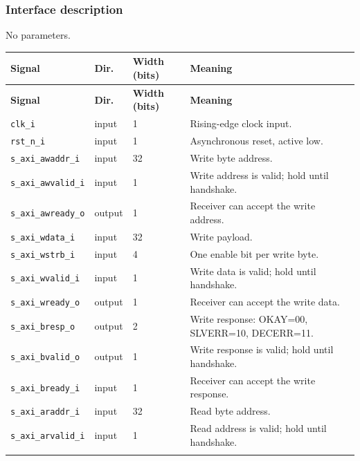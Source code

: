 \documentclass[11pt]{article}
\begin{document}
\subsubsection{Interface description}
\noindent No parameters.\par\medskip
{\small
\begin{longtable}{@{}L{0.3400\dimexpr\linewidth-36pt\relax}L{0.1000\dimexpr\linewidth-36pt\relax}L{0.1000\dimexpr\linewidth-36pt\relax}L{0.4600\dimexpr\linewidth-36pt\relax}@{}}
\toprule
\textbf{Signal} & \textbf{Dir.} & \textbf{Width (bits)} & \textbf{Meaning} \\ \midrule
\endfirsthead
\toprule
\textbf{Signal} & \textbf{Dir.} & \textbf{Width (bits)} & \textbf{Meaning} \\ \midrule
\endhead
\texttt{clk\_i} & input & 1 & Rising-edge clock input. \\ \addlinespace[3pt]
\texttt{rst\_n\_i} & input & 1 & Asynchronous reset, active low. \\ \addlinespace[3pt]
\texttt{s\_axi\_awaddr\_i} & input & 32 & Write byte address. \\ \addlinespace[3pt]
\texttt{s\_axi\_awvalid\_i} & input & 1 & Write address is valid; hold until handshake. \\ \addlinespace[3pt]
\texttt{s\_axi\_awready\_o} & output & 1 & Receiver can accept the write address. \\ \addlinespace[3pt]
\texttt{s\_axi\_wdata\_i} & input & 32 & Write payload. \\ \addlinespace[3pt]
\texttt{s\_axi\_wstrb\_i} & input & 4 & One enable bit per write byte. \\ \addlinespace[3pt]
\texttt{s\_axi\_wvalid\_i} & input & 1 & Write data is valid; hold until handshake. \\ \addlinespace[3pt]
\texttt{s\_axi\_wready\_o} & output & 1 & Receiver can accept the write data. \\ \addlinespace[3pt]
\texttt{s\_axi\_bresp\_o} & output & 2 & Write response: OKAY=00, SLVERR=10, DECERR=11. \\ \addlinespace[3pt]
\texttt{s\_axi\_bvalid\_o} & output & 1 & Write response is valid; hold until handshake. \\ \addlinespace[3pt]
\texttt{s\_axi\_bready\_i} & input & 1 & Receiver can accept the write response. \\ \addlinespace[3pt]
\texttt{s\_axi\_araddr\_i} & input & 32 & Read byte address. \\ \addlinespace[3pt]
\texttt{s\_axi\_arvalid\_i} & input & 1 & Read address is valid; hold until handshake. \\ \addlinespace[3pt]

\end{longtable}}
\end{document}
